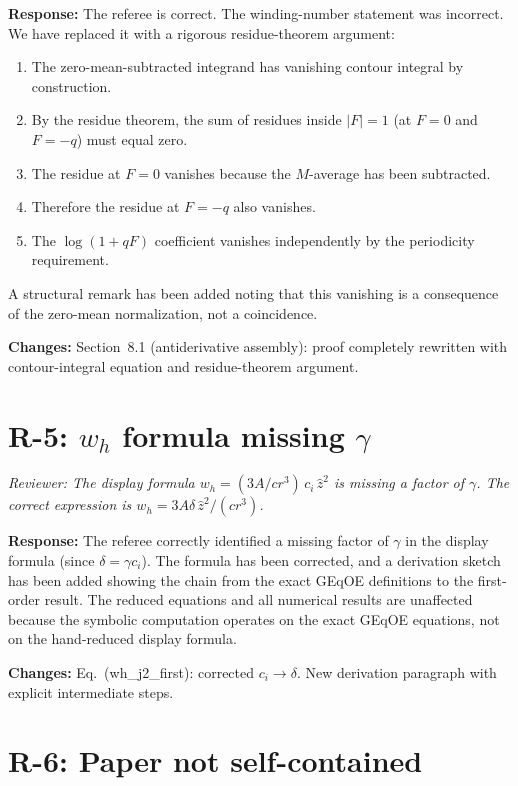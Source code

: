 \documentclass[11pt]{article}
\newcommand{\rev}[1]{\textcolor{revcolor}{\emph{#1}}}
\begin{document}
\textbf{Response:} The referee is correct. The winding-number statement was
incorrect. We have replaced it with a rigorous residue-theorem argument:
\begin{enumerate}[nosep]
\item The zero-mean-subtracted integrand has vanishing contour integral
  by construction.
\item By the residue theorem, the sum of residues inside $|F|=1$ (at
  $F=0$ and $F=-q$) must equal zero.
\item The residue at $F=0$ vanishes because the $M$-average has been
  subtracted.
\item Therefore the residue at $F=-q$ also vanishes.
\item The $\log(1+qF)$ coefficient vanishes independently by the
  periodicity requirement.
\end{enumerate}
A structural remark has been added noting that this vanishing is a
consequence of the zero-mean normalization, not a coincidence.

\textbf{Changes:} Section~8.1 (antiderivative assembly): proof completely
rewritten with contour-integral equation and residue-theorem argument.

\section*{R-5: $w_h$ formula missing $\gamma$}

\rev{Reviewer: The display formula $w_h = (3A/cr^3)\,c_i\,\hat z^2$ is
missing a factor of $\gamma$. The correct expression is
$w_h = 3A\delta\,\hat z^2/(cr^3)$.}

\textbf{Response:} The referee correctly identified a missing factor of
$\gamma$ in the display formula (since $\delta = \gamma c_i$). The formula
has been corrected, and a derivation sketch has been added showing the chain
from the exact GEqOE definitions to the first-order result.
The reduced equations and all numerical results are unaffected because
the symbolic computation operates on the exact GEqOE equations, not on the
hand-reduced display formula.

\textbf{Changes:} Eq.~(wh\_j2\_first): corrected $c_i \to \delta$.
New derivation paragraph with explicit intermediate steps.

\section*{R-6: Paper not self-contained}
\end{document}
